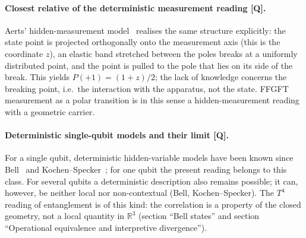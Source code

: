 \paragraph{Closest relative of the deterministic measurement reading
[Q].} Aerts' hidden-measurement model~\cite{aerts1986,aerts2014}
realises the same structure explicitly: the state point is projected
orthogonally onto the measurement axis (this is the coordinate $z$),
an elastic band stretched between the poles breaks at a uniformly
distributed point, and the point is pulled to the pole that lies on
its side of the break. This yields $P(+1) = (1+z)/2$; the lack of
knowledge concerns the breaking point, i.e.\ the interaction with the
apparatus, not the state. FFGFT measurement as
a polar transition is in this sense a hidden-measurement reading with a
geometric carrier.

\paragraph{Deterministic single-qubit models and their limit [Q].}
For a single qubit, deterministic hidden-variable models have been
known since Bell~\cite{bell1966} and Kochen--Specker~\cite{kochen1967};
for one qubit the present reading belongs to this class. For several
qubits a deterministic description also remains possible; it can,
however, be neither local nor non-contextual (Bell, Kochen--Specker).
The $T^4$ reading of entanglement is of this kind: the correlation is
a property of the closed geometry, not a local quantity in
$\mathbb{R}^3$ (section \enquote{Bell states} and section
\enquote{Operational equivalence and interpretive divergence}).

